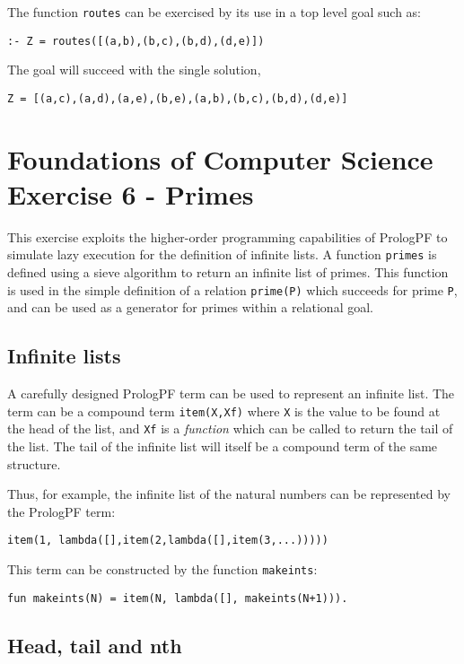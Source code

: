 The function \texttt{routes} can be exercised by its use in a top level goal such as:\\
\centerline{\texttt{:- Z = routes([(a,b),(b,c),(b,d),(d,e)])}}
The goal will succeed with the single solution,\\
\centerline{\texttt{Z = [(a,c),(a,d),(a,e),(b,e),(a,b),(b,c),(b,d),(d,e)]}}

\section[Exercise 6 - Primes]{Foundations of Computer Science Exercise 6 - Primes} %

This exercise exploits the higher-order programming capabilities of PrologPF to
simulate lazy execution for the definition of infinite lists.  A function
\texttt{primes} is defined using a sieve algorithm to return
an infinite list of primes.  This
function is used in the simple definition of a relation \texttt{prime(P)} which
succeeds for prime \texttt{P}, and can be used as a generator for primes within
a relational goal.

\subsection{Infinite lists}
\enlargethispage{-\baselineskip}

A carefully designed PrologPF term can be used to represent an infinite list.  The
term can be a compound term \texttt{item(X,Xf)} where \texttt{X} is the value to be 
found at the
head of the list, and \texttt{Xf} is a \textit{function} which can be called to
return the tail of the list.  The tail of the infinite list will itself be a compound
term of the same structure.

Thus, for example, the infinite list of the natural numbers can
be represented by the PrologPF term:\\
\centerline{\texttt{item(1, lambda([],item(2,lambda([],item(3,...))))) }}
This term can be constructed by the function \texttt{makeints}:
\begin{verbatim}
fun makeints(N) = item(N, lambda([], makeints(N+1))).
\end{verbatim}

\subsection{Head, tail and nth}

